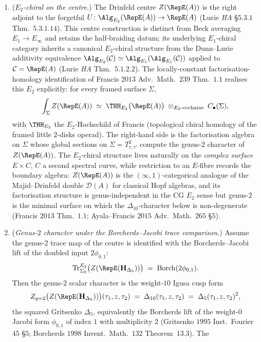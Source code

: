 \begin{proposition}
\begin{enumerate}[label=(\alph*),leftmargin=1.6em]
 \item (\emph{$E_2$-chiral on the centre.}) The Drinfeld centre
 $Z(\RepE(A))$ is the right adjoint to the forgetful
 $U\colon\Alg_{E_2}(\RepE(A))\to\RepE(A)$ (Lurie \emph{HA} \S$5.3.1$
 Thm.\ $5.3.1.14$). This centre construction is distinct from Beck
 averaging $E_1\to E_\infty$ and retains the half-braiding datum; its
 underlying $E_1$-chiral category inherits a canonical $E_2$-chiral
 structure from the Dunn--Lurie additivity equivalence
 $\Alg_{E_2}(\mathcal C)\simeq\Alg_{E_1}(\Alg_{E_1}(\mathcal C))$
 applied to $\mathcal C=\RepE(A)$ (Lurie \emph{HA} Thm.\ $5.1.2.2$).
 The locally-constant factorisation-homology identification of
 Francis $2013$ Adv.\ Math.\ $239$ Thm.\ $1.1$ realises this $E_2$
 explicitly: for every framed surface $\Sigma$,
 \[
 \int_\Sigma Z(\RepE(A))
 \;\simeq\;
 \THH_{E_2}\bigl(\RepE(A)\bigr)\;\otimes_{E_2\text{-cochains}}\;
 C_\bullet(\Sigma),
 \]
 with $\THH_{E_2}$ the $E_2$-Hochschild of Francis (topological
 chiral homology of the framed little $2$-disks operad). The
 right-hand side is the factorisation algebra on $\Sigma$ whose
 global sections on $\Sigma=T^2_{\tau,\tau'}$ compute the genus-$2$
 character of $Z(\RepE(A))$. The $E_2$-chiral structure lives naturally
 on the \emph{complex surface} $E\times C$, $C$ a second spectral
 curve, while restriction to an $E$-fibre records the boundary
 algebra: $Z(\RepE(A))$ is the
 $(\infty,1)$-categorical analogue of the Majid--Drinfeld double
 $\mathcal D(A)$ for classical Hopf algebras, and its factorisation
 structure is genus-independent in the CG $E_2$ sense but genus-$2$
 is the minimal surface on which the $\Delta_{10}$-character below
 is non-degenerate (Francis $2013$ Thm.\ $1.1$; Ayala--Francis
 $2015$ Adv.\ Math.\ $265$ \S$5$).
 \item (\emph{Genus-$2$ character under the Borcherds--Jacobi trace comparison.})
 Assume the genus-$2$ trace map of the centre is identified with the
 Borcherds--Jacobi lift of the doubled input \(2\phi_{0,1}\):
 \[
 \mathrm{Tr}^{E_2}_{\Sigma_2}\bigl(Z(\RepE(\mathbf H_{\Delta_5}))\bigr)
 \;=\; \operatorname{Borch}(2\phi_{0,1}).
 \]
 Then the genus-$2$ scalar character is the weight-$10$ Igusa cusp form
 \[
 Z_{g=2}\bigl(Z(\RepE(\mathbf H_{\Delta_5}))\bigr)(\tau_1,z,\tau_2)
 \;=\; \Delta_{10}(\tau_1,z,\tau_2)
 \;=\; \Delta_5(\tau_1,z,\tau_2)^2,
 \]
 the squared Gritsenko $\Delta_5$, equivalently the Borcherds lift
 of the weight-$0$ Jacobi form $\phi_{0,1}$ of index $1$ with
 multiplicity $2$ (Gritsenko $1995$ Inst.\ Fourier $45$ \S$5$;
 Borcherds $1998$ Invent.\ Math.\ $132$ Theorem~$13.3$). The

\end{enumerate}
\end{proposition}
